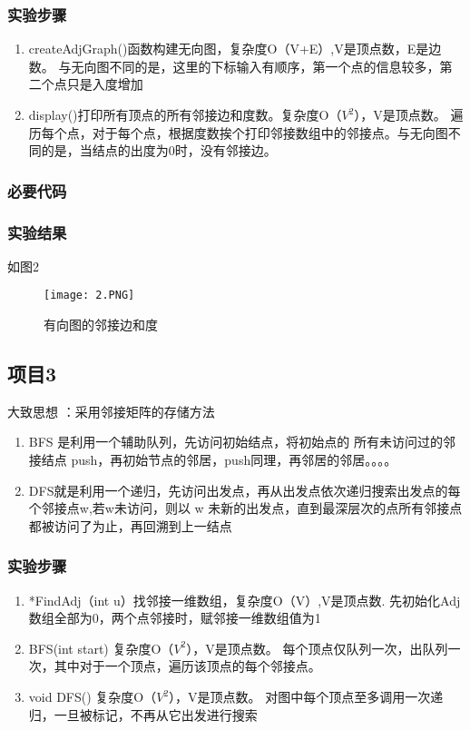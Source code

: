 \subsubsection{实验步骤}
\begin{enumerate}
\item createAdjGraph()函数构建无向图，复杂度O（V+E）,V是顶点数，E是边数。          与无向图不同的是，这里的下标输入有顺序，第一个点的信息较多，第二个点只是入度增加
\item display()打印所有顶点的所有邻接边和度数。复杂度O（$V^2$），V是顶点数。       遍历每个点，对于每个点，根据度数挨个打印邻接数组中的邻接点。与无向图不同的是，当结点的出度为0时，没有邻接边。
\end{enumerate}

\subsubsection{必要代码}


\subsubsection{实验结果}如图2
	\begin{figure}[!bthp]
	\centering
        \texttt{[image: 2.PNG]}
        \caption{有向图的邻接边和度}
      \end{figure}

\subsection{项目3}
大致思想 ：采用邻接矩阵的存储方法
\begin{enumerate}
\item BFS 是利用一个辅助队列，先访问初始结点，将初始点的 所有未访问过的邻接结点 push，再初始节点的邻居，push同理，再邻居的邻居。。。。
\item DFS就是利用一个递归，先访问出发点，再从出发点依次递归搜索出发点的每个邻接点w,若w未访问，则以 w 未新的出发点，直到最深层次的点所有邻接点都被访问了为止，再回溯到上一结点
\end{enumerate}
\subsubsection{实验步骤}
\begin{enumerate}
\item *FindAdj（int u）找邻接一维数组，复杂度O（V）,V是顶点数.       先初始化Adj数组全部为0，两个点邻接时，赋邻接一维数组值为1
\item BFS(int start) 复杂度O（$V^2$），V是顶点数。             每个顶点仅队列一次，出队列一次，其中对于一个顶点，遍历该顶点的每个邻接点。
\item void DFS()  复杂度O（$V^2$），V是顶点数。              对图中每个顶点至多调用一次递归，一旦被标记，不再从它出发进行搜索       
\end{enumerate}
